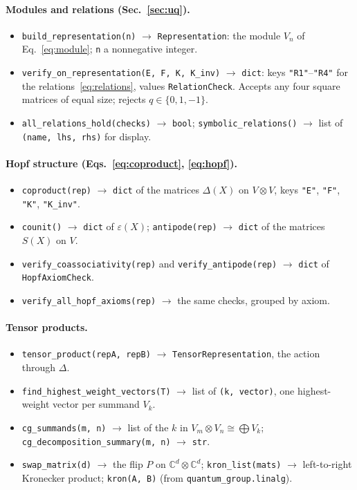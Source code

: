 \documentclass{SciPost}
\begin{document}
\begin{appendix}
\paragraph{Modules and relations (Sec.~\ref{sec:uq}).}
\begin{itemize}\setlength{\itemsep}{1pt}\setlength{\parskip}{0pt}
\item \texttt{build\_representation(n)} $\to$ \texttt{Representation}: the module $V_n$ of Eq.~\eqref{eq:module}; \texttt{n} a nonnegative integer.
\item \texttt{verify\_on\_representation(E, F, K, K\_inv)} $\to$ \texttt{dict}: keys \texttt{"R1"}--\texttt{"R4"} for the relations~\eqref{eq:relations}, values \texttt{RelationCheck}. Accepts any four square matrices of equal size; rejects $q\in\{0,1,-1\}$.
\item \texttt{all\_relations\_hold(checks)} $\to$ \texttt{bool}; \texttt{symbolic\_relations()} $\to$ list of \texttt{(name, lhs, rhs)} for display.
\end{itemize}

\paragraph{Hopf structure (Eqs.~\eqref{eq:coproduct}, \eqref{eq:hopf}).}
\begin{itemize}\setlength{\itemsep}{1pt}\setlength{\parskip}{0pt}
\item \texttt{coproduct(rep)} $\to$ \texttt{dict} of the matrices $\Delta(X)$ on $V\otimes V$, keys \texttt{"E"}, \texttt{"F"}, \texttt{"K"}, \texttt{"K\_inv"}.
\item \texttt{counit()} $\to$ \texttt{dict} of $\varepsilon(X)$; \texttt{antipode(rep)} $\to$ \texttt{dict} of the matrices $S(X)$ on $V$.
\item \texttt{verify\_coassociativity(rep)} and \texttt{verify\_antipode(rep)} $\to$ \texttt{dict} of \texttt{HopfAxiomCheck}.
\item \texttt{verify\_all\_hopf\_axioms(rep)} $\to$ the same checks, grouped by axiom.
\end{itemize}

\paragraph{Tensor products.}
\begin{itemize}\setlength{\itemsep}{1pt}\setlength{\parskip}{0pt}
\item \texttt{tensor\_product(repA, repB)} $\to$ \texttt{TensorRepresentation}, the action through $\Delta$.
\item \texttt{find\_highest\_weight\_vectors(T)} $\to$ list of \texttt{(k, vector)}, one highest-weight vector per summand $V_k$.
\item \texttt{cg\_summands(m, n)} $\to$ list of the $k$ in $V_m\otimes V_n\cong\bigoplus V_k$; \texttt{cg\_decomposition\_summary(m, n)} $\to$ \texttt{str}.
\item \texttt{swap\_matrix(d)} $\to$ the flip $P$ on $\mathbb{C}^d\otimes\mathbb{C}^d$; \texttt{kron\_list(mats)} $\to$ left-to-right Kronecker product; \texttt{kron(A, B)} (from \texttt{quantum\_group.linalg}).
\end{itemize}


\end{appendix}
\end{document}
